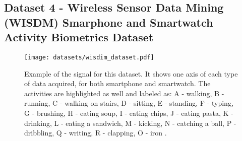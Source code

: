 %
    
\subsection{Dataset 4 - Wireless Sensor Data Mining (WISDM) Smarphone and Smartwatch Activity Biometrics Dataset}
\label{dat:dataset5}

\begin{figure}
\centering
\texttt{[image: datasets/wisdim\_dataset.pdf]}
\caption{Example of the signal for this dataset. It shows one axis of each type of data acquired, for both smartphone and smartwatch. The activities are highlighted as well and labeled as: A - walking, B - running, C - walking on stairs, D - sitting, E - standing, F -   typing, G - brushing, H - eating soup, I - eating chips, J - eating pasta, K - drinking, L - eating a sandwich, M - kicking, N - catching a ball, P - dribbling, Q - writing, R - clapping, O - iron \cite{dataset4}.}
\label{fig:wisdim_data}
\end{figure}

